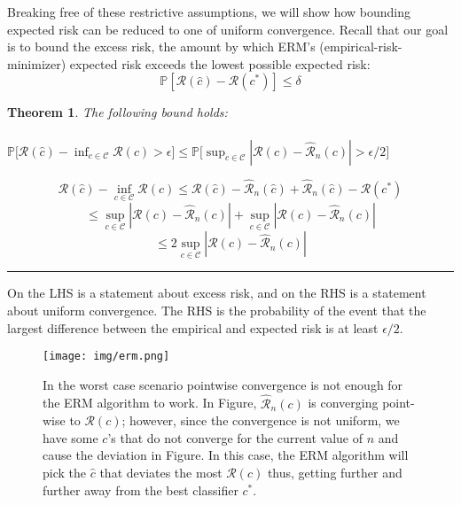 \documentclass[twoside]{article}
\newcounter{lecnum}
\newtheorem{theorem}{Theorem}[lecnum]
\newenvironment{proof}{{\bf Proof:}}{\hfill\rule{2mm}{2mm}}
\begin{document}
Breaking free of these restrictive assumptions, we will show how bounding expected
risk can be reduced to one of uniform convergence. Recall that our goal is to bound
the excess risk, the amount by which ERM’s (empirical-risk-minimizer) expected risk exceeds the lowest possible
expected risk:
$$\mathbb{P}[\mathcal{R}(\hat{c})- \mathcal{R}(c^*)] \leq \delta$$

\begin{theorem} The following bound holds:\\ \\
$\mathbb{P}\Big[\mathcal{R}(\hat{c}) - \inf_{c \in \mathcal{C}}{\mathcal{R}(c)} > \epsilon \Big] \leq \mathbb{P}\Big[ \sup_{c \in  \mathcal{C}}{|\mathcal{R}(c)- \mathcal{\hat{R}}_{n}(c) | > \epsilon/2} \Big]$
\end{theorem}

\begin{proof}
$$\mathcal{R}(\hat{c})- \inf_{c \in \mathcal{C}}{\mathcal{R}(c)} \leq \mathcal{R}(\hat{c})- \mathcal{\hat{R}}_{n}(\hat{c})+
\mathcal{\hat{R}}_{n}(\hat{c}) - \mathcal{R}(c^*)$$
$$\leq \sup_{c \in  \mathcal{C}}{|\mathcal{R}(c)- \mathcal{\hat{R}}_{n}(c)|} + \sup_{c \in  \mathcal{C}}{|\mathcal{R}(c)- \mathcal{\hat{R}}_{n}(c) |}$$
$$\leq 2\sup_{c \in  \mathcal{C}}{|\mathcal{R}(c)- \mathcal{\hat{R}}_{n}(c)|}$$
\end{proof}

On the LHS is a statement about excess risk, and on the RHS is a statement about
uniform convergence. The RHS is the probability of the event that the largest difference
between the empirical and expected risk is at least $\epsilon/2$.
\begin{figure}[h]
\centering
\texttt{[image: img/erm.png]}
\caption{In the worst case scenario pointwise convergence is not enough for the ERM algorithm to work. In Figure, $\mathcal{\hat{R}}_{n}(c)$ is  converging point-wise to $\mathcal{R}(c)$; however, since the convergence is not uniform, we have some $c$'s that do not converge for the current value of $n$ and cause the deviation in Figure. In this case, the ERM algorithm will pick the $\hat{c}$ that deviates the most $\mathcal{R}(c)$  thus, getting further and further away from the best classifier $c^*$.}
\end{figure}
\end{document}
